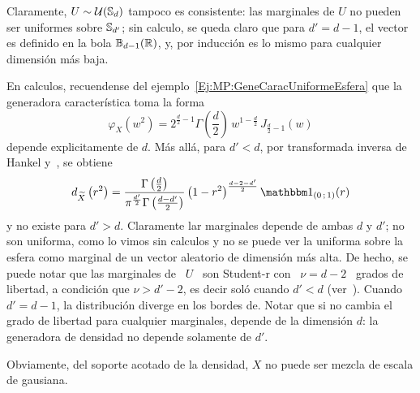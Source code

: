 \begin{ejemplo}\label{Ej:MP:UniformeCnt}
%
  Claramente, $U \sim  \mathcal{U}(\mathbb{S}_d)$ tampoco es consistente: las  marginales de $U$ no
  pueden ser uniformes sobre $\mathbb{S}_{d'}$;  sin calculo, se queda claro que para
  $d' =  d-1$, el  vector es  definido en la  bola $\mathbb{B}_{d-1}(\mathbb{R})$,  y, por
  inducci\'on es lo mismo para cualquier dimensi\'on m\'as baja.

  En  calculos, recuendense del  ejemplo~\ref{Ej:MP:GeneCaracUniformeEsfera} que
  la generadora caracter\'istica toma la forma
  \[
  \varphi_X\left(  w^2  \right)  =  2^{\frac{d}{2}-1}  \Gamma\left(  \frac{d}{2}
  \right) \, w^{1-\frac{d}{2}} \, J_{\frac{d}{2}-1}\left( w \right)
  \]
  depende explicitamente de  $d$. M\'as all\'a, para $d'  < d$, por transformada
  inversa de Hankel y~\cite[Ec.~6.575-1]{GraRyz15}, se obtiene
  \[
  d_{\widetilde{X}}\left(   r^2   \right)   =   \frac{\Gamma\left(   \frac{d}{2}
    \right)}{\pi^{\frac{d'}{2}} \Gamma\left( \frac{d-d'}{2}  \right)} \left( 1 -
    r^2 \right)^{\frac{d-2-d'}{2}} \un_{(0 \; 1)}(r)
  \]
  y no existe para  $d' > d$.  Claramente lar marginales depende  de ambas $d$ y
  $d'$;  no son  uniforma, como  lo vimos  sin  calculos y  no se  puede ver  la
  uniforma sobre la  esfera como marginal de un  vector aleatorio de dimensi\'on
  m\'as  alta.  De  hecho, se  puede notar  que las  marginales de  \ $U$  \ son
  Student-r con  \ $\nu = d-2$  \ grados de  libertad, a condici\'on que  $\nu >
  d'-2$, es decir sol\'o cuando $d'  < d$ (ver~\cite{titi, toto, Zoz}). Cuando \
  $d' = d-1$, la distribuci\'on diverge en los bordes de. Notar que si no cambia
  el grado de libertad para cualquier marginales, depende de la dimensi\'on $d$:
  la generadora de densidad no depende solamente de $d'$.

  Obviamente, del  soporte acotado de  la densidad, $X$  no puede ser  mezcla de
  escala de gausiana. \SZ{En calculos...}
\end{ejemplo}


